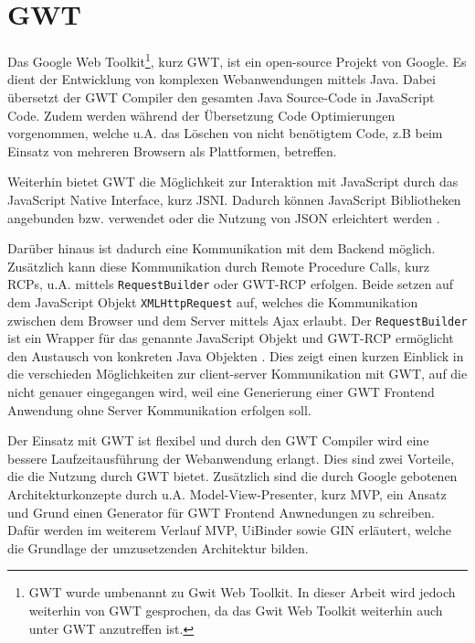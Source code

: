 \section{GWT}
\label{GWT}
Das Google Web Toolkit\footnote{GWT wurde umbenannt zu Gwit Web Toolkit. In dieser Arbeit wird jedoch
weiterhin von GWT gesprochen, da das Gwit Web Toolkit weiterhin auch unter GWT
anzutreffen ist.}, kurz GWT, ist ein open-source Projekt von Google.
Es dient der Entwicklung von komplexen Webanwendungen mittels Java.
Dabei übersetzt der GWT Compiler den gesamten Java Source-Code in JavaScript Code.
Zudem werden während der Übersetzung Code Optimierungen vorgenommen, welche u.A.
das Löschen von nicht benötigtem Code, z.B beim Einsatz von mehreren
Browsern als Plattformen, betreffen. 

Weiterhin bietet GWT die Möglichkeit zur Interaktion mit JavaScript durch
das JavaScript Native Interface, kurz JSNI.
Dadurch können JavaScript Bibliotheken angebunden bzw. verwendet oder die
Nutzung von JSON erleichtert werden \cite[S. 4-9]{bib:GWTinAction}\cite[S.
237-238]{bib:GWToReilly}.

Darüber hinaus ist dadurch eine Kommunikation mit dem Backend
möglich. Zusätzlich kann diese Kommunikation durch Remote Procedure Calls,
kurz RCPs, u.A. mittels \texttt{RequestBuilder} oder GWT-RCP erfolgen. Beide
setzen auf dem JavaScript Objekt \texttt{XMLHttpRequest} auf,
welches die Kommunikation zwischen dem Browser und dem Server mittels Ajax
erlaubt. Der \texttt{RequestBuilder} ist ein Wrapper für das genannte JavaScript
Objekt und GWT-RCP ermöglicht den Austausch von konkreten Java Objekten \cite[S. 16]{bib:GWTinAction}\cite[S.
222]{bib:GWToReilly}. Dies zeigt einen kurzen Einblick in die
verschieden Möglichkeiten zur client-server Kommunikation mit GWT, auf die nicht
genauer eingegangen wird, weil eine Generierung einer GWT
Frontend Anwendung ohne Server Kommunikation erfolgen soll.

Der Einsatz mit GWT ist flexibel und durch den GWT Compiler wird 
eine bessere Laufzeitausführung der Webanwendung erlangt\cite{bib:GWTStarted}.
Dies sind zwei Vorteile, die die Nutzung durch GWT bietet. Zusätzlich
sind die durch Google gebotenen Architekturkonzepte durch u.A. Model-View-Presenter, kurz MVP, ein
Ansatz und Grund einen Generator für GWT Frontend Anwnedungen zu schreiben.
Dafür werden im weiterem Verlauf MVP, UiBinder sowie GIN erläutert, welche die
Grundlage der umzusetzenden Architektur bilden.
